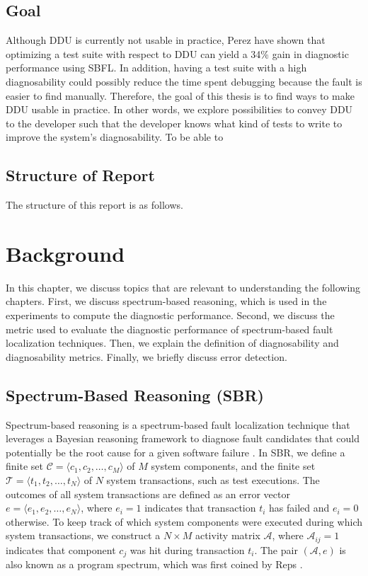 \documentclass[twoside,a4paper,11pt]{memoir}
\begin{document}
\section{Goal}
Although DDU is currently not usable in practice, Perez \etal \cite{DBLP:conf/icse/PerezAD17} have shown that optimizing a test suite with respect to DDU can yield a 34\% gain in diagnostic performance using SBFL.
In addition, having a test suite with a high diagnosability could possibly reduce the time spent debugging because the fault is easier to find manually.
Therefore, the goal of this thesis is to find ways to make DDU usable in practice.
In other words, we explore possibilities to convey DDU to the developer such that the developer knows what kind of tests to write to improve the system's diagnosability.
To be able to


\section{Structure of Report}
The structure of this report is as follows.

\chapter{Background}
\label{ch:background}

In this chapter, we discuss topics that are relevant to understanding the following chapters.
First, we discuss spectrum-based reasoning, which is used in the experiments to compute the diagnostic performance.
Second, we discuss the metric used to evaluate the diagnostic performance of spectrum-based fault localization techniques.
Then, we explain the definition of diagnosability and diagnosability metrics.
Finally, we briefly discuss error detection.

\section{Spectrum-Based Reasoning (SBR)}

Spectrum-based reasoning is a spectrum-based fault localization technique that leverages a Bayesian reasoning framework to diagnose fault candidates that could potentially be the root cause for a given software failure \cite{abreu2009spectrum}.
In SBR, we define a finite set $\mathcal{C} = \langle c_1, c_2, \ldots, c_M \rangle$ of $M$ system components, and the finite set $\mathcal{T} = \langle t_1, t_2, \ldots, t_N \rangle$ of $N$ system transactions, such as test executions.
The outcomes of all system transactions are defined as an error vector $e = \langle e_1, e_2, \ldots, e_N \rangle$, where $e_i = 1$ indicates that transaction $t_i$ has failed and $e_i = 0$ otherwise.
To keep track of which system components were executed during which system transactions, we construct a $N \times M$ activity matrix $\mathcal{A}$, where $\mathcal{A}_{ij} = 1$ indicates that component $c_j$ was hit during transaction $t_i$.
The pair $(\mathcal{A}, e)$ is also known as a program spectrum, which was first coined by Reps \etal \cite{reps1997use}.
\end{document}
